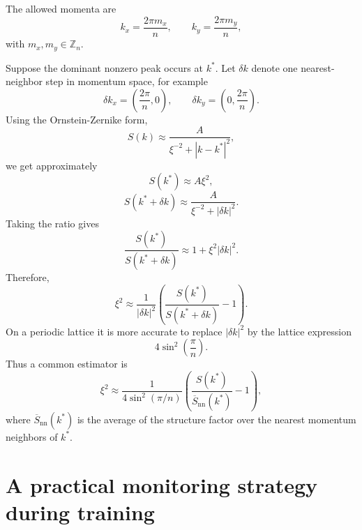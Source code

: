 \documentclass[11pt]{article}
\newcommand{\Zn}{\mathbb{Z}_n}
\begin{document}
The allowed momenta are
\begin{equation}
    k_x = \frac{2\pi m_x}{n}, \qquad k_y = \frac{2\pi m_y}{n},
\end{equation}
with $m_x,m_y \in \Zn$.

Suppose the dominant nonzero peak occurs at $k^*$. Let $\delta k$ denote one nearest-neighbor step in momentum space, for example
\begin{equation}
    \delta k_x = \left(\frac{2\pi}{n},0\right), \qquad
    \delta k_y = \left(0,\frac{2\pi}{n}\right).
\end{equation}
Using the Ornstein-Zernike form,
\begin{equation}
    S(k) \approx \frac{A}{\xi^{-2}+|k-k^*|^2},
\end{equation}
we get approximately
\begin{equation}
    S(k^*) \approx A\xi^2,
\end{equation}
\begin{equation}
    S(k^*+\delta k) \approx \frac{A}{\xi^{-2}+|\delta k|^2}.
\end{equation}
Taking the ratio gives
\begin{equation}
    \frac{S(k^*)}{S(k^*+\delta k)} \approx 1 + \xi^2 |\delta k|^2.
\end{equation}
Therefore,
\begin{equation}
    \xi^2 \approx \frac{1}{|\delta k|^2}\left(\frac{S(k^*)}{S(k^*+\delta k)} - 1\right).
\end{equation}
On a periodic lattice it is more accurate to replace $|\delta k|^2$ by the lattice expression
\begin{equation}
    4\sin^2\left(\frac{\pi}{n}\right).
\end{equation}
Thus a common estimator is
\begin{equation}
    \xi^2 \approx \frac{1}{4\sin^2(\pi/n)}
    \left(\frac{S(k^*)}{\overline{S}_{\text{nn}}(k^*)} - 1\right),
\end{equation}
where $\overline{S}_{\text{nn}}(k^*)$ is the average of the structure factor over the nearest momentum neighbors of $k^*$.

\section{A practical monitoring strategy during training}
\end{document}
